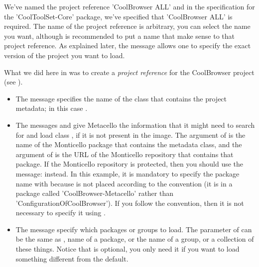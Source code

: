 \documentclass[a4paper,10pt,twoside]{book}
\begin{document}
We've named the project reference 'CoolBrowser ALL' and in the specification for the 'CoolToolSet-Core' package, we've specified that 'CoolBrowser ALL' is required. The name of the project reference is arbitrary, you can select the name you want, although is recommended to put a name that make sense to that project reference. 
 
As explained later, the message  allows one to specify the exact version of the project you want to load.



What we did here in  was to create a \emph{project reference} for the CoolBrowser project (see ). 

\begin{itemize}
\item The message  specifies the name of the class that contains the project metadata; in this case .

\item The messages  and  give Metacello the information  that it might need to search for and load class , if it is not present in the image.  The argument of  is the name of the Monticello package that contains the metadata class, and the argument of  is the URL of the Monticello repository that contains that package.
If the Monticello repository is protected, then you should use the message:  instead.
In this example, it is mandatory to specify the package name with  because  is not placed according to the convention (it is in a package called 'CoolBrowser-Metacello' rather than 'ConfigurationOfCoolBrowser'). If you follow the convention, then it is not necessary to specify it using .

\item The message  specify which packages or groups to load.  The parameter of  can be the same as , \ie name of a package, or the name of a group, or a collection of these things. Notice that  is optional, you only need it if you want to load something different from the default. 


\end{itemize}
\end{document}

